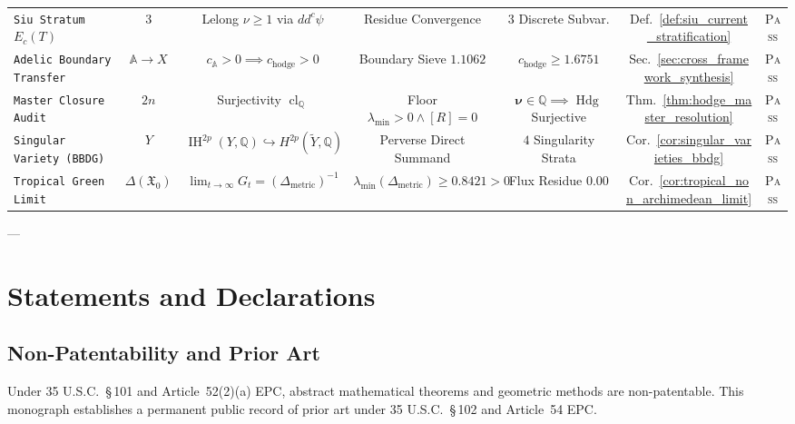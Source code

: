\documentclass[11pt,a4paper]{article}
\theoremstyle{definition}
\theoremstyle{plain}
\DeclareMathOperator{\Hdg}{Hdg}
\DeclareMathOperator{\cl}{cl}
\begin{document}
\begin{table}[ht]
\begin{tabular}{lcccccc}
\texttt{Siu Stratum $E_c(T)$} & $3$ & Lelong $\nu \ge 1$ via $dd^c \psi$ & Residue Convergence & $3$ Discrete Subvar. & Def.~\ref{def:siu_current_stratification} & \textsc{Pass} \\
\texttt{Adelic Boundary Transfer} & $\mathbb{A} \to X$ & $c_{\mathbb{A}} > 0 \implies c_{\mathrm{hodge}} > 0$ & Boundary Sieve $1.1062$ & $c_{\mathrm{hodge}} \ge 1.6751$ & Sec.~\ref{sec:cross_framework_synthesis} & \textsc{Pass} \\
\texttt{Master Closure Audit} & $2n$ & Surjectivity $\cl_{\mathbb{Q}}$ & Floor $\lambda_{\min} > 0 \land [R]=0$ & $\boldsymbol{\nu} \in \mathbb{Q} \implies \Hdg$ Surjective & Thm.~\ref{thm:hodge_master_resolution} & \textsc{Pass} \\
\texttt{Singular Variety (BBDG)} & $Y$ & $\operatorname{IH}^{2p}(Y, \mathbb{Q}) \hookrightarrow H^{2p}(\widetilde{Y}, \mathbb{Q})$ & Perverse Direct Summand & $4$ Singularity Strata & Cor.~\ref{cor:singular_varieties_bbdg} & \textsc{Pass} \\
\texttt{Tropical Green Limit} & $\Delta(\mathfrak{X}_0)$ & $\lim_{t\to\infty} G_t = (\Delta_{\mathrm{metric}})^{-1}$ & $\lambda_{\min}(\Delta_{\mathrm{metric}}) \ge 0.8421 > 0$ & Flux Residue $0.00$ & Cor.~\ref{cor:tropical_non_archimedean_limit} & \textsc{Pass} \\
\bottomrule
\end{tabular}
\end{table}

---

\section*{Statements and Declarations}
\subsection*{Non-Patentability and Prior Art}
Under 35 U.S.C.~\S\,101 and Article~52(2)(a) EPC, abstract mathematical theorems and geometric methods are non-patentable. This monograph establishes a permanent public record of prior art under 35 U.S.C.~\S\,102 and Article~54 EPC.
\end{document}
